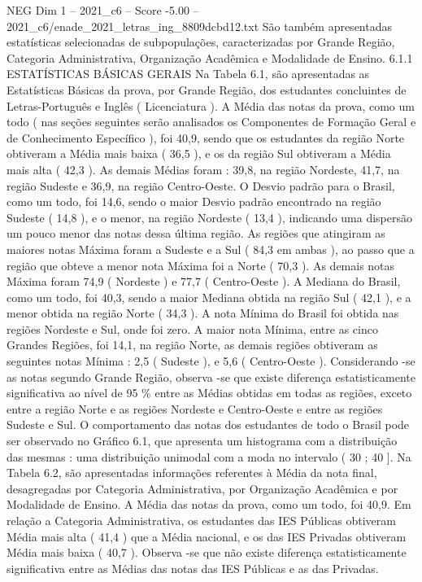 \begin{textsample}{NEG Dim 1 – 2021\_c6 – Score -5.00 – 2021\_c6/enade\_2021\_letras\_ing\_8809dcbd12.txt}
São também apresentadas estatísticas selecionadas de subpopulações, caracterizadas por Grande Região, Categoria Administrativa, Organização Acadêmica e Modalidade de Ensino. 6.1.1 ESTATÍSTICAS BÁSICAS GERAIS Na Tabela 6.1, são apresentadas as Estatísticas Básicas da prova, por Grande Região, dos estudantes concluintes de Letras-Português e Inglês ( Licenciatura ).
A Média das notas da prova, como um todo ( nas seções seguintes serão analisados os Componentes de Formação Geral e de Conhecimento Específico ), foi 40,9, sendo que os estudantes da região Norte obtiveram a Média mais baixa ( 36,5 ), e os da região Sul obtiveram a Média mais alta ( 42,3 ).
As demais Médias foram : 39,8, na região Nordeste, 41,7, na região Sudeste e 36,9, na região Centro-Oeste.
O Desvio padrão para o Brasil, como um todo, foi 14,6, sendo o maior Desvio padrão encontrado na região Sudeste ( 14,8 ), e o menor, na região Nordeste ( 13,4 ), indicando uma dispersão um pouco menor das notas dessa última região.
As regiões que atingiram as maiores notas Máxima foram a Sudeste e a Sul ( 84,3 em ambas ), ao passo que a região que obteve a menor nota Máxima foi a Norte ( 70,3 ).
As demais notas Máxima foram 74,9 ( Nordeste ) e 77,7 ( Centro-Oeste ).
A Mediana do Brasil, como um todo, foi 40,3, sendo a maior Mediana obtida na região Sul ( 42,1 ), e a menor obtida na região Norte ( 34,3 ).
A nota Mínima do Brasil foi obtida nas regiões Nordeste e Sul, onde foi zero.
A maior nota Mínima, entre as cinco Grandes Regiões, foi 14,1, na região Norte, as demais regiões obtiveram as seguintes notas Mínima : 2,5 ( Sudeste ), e 5,6 ( Centro-Oeste ).
Considerando -se as notas segundo Grande Região, observa -se que existe diferença estatisticamente significativa ao nível de 95 \% entre as Médias obtidas em todas as regiões, exceto entre a região Norte e as regiões Nordeste e Centro-Oeste e entre as regiões Sudeste e Sul.
O comportamento das notas dos estudantes de todo o Brasil pode ser observado no Gráfico 6.1, que apresenta um histograma com a distribuição das mesmas : uma distribuição unimodal com a moda no intervalo ( 30 ; 40 ].
Na Tabela 6.2, são apresentadas informações referentes à Média da nota final, desagregadas por Categoria Administrativa, por Organização Acadêmica e por Modalidade de Ensino.
A Média das notas da prova, como um todo, foi 40,9.
Em relação a Categoria Administrativa, os estudantes das IES Públicas obtiveram Média mais alta ( 41,4 ) que a Média nacional, e os das IES Privadas obtiveram Média mais baixa ( 40,7 ).
Observa -se que não existe diferença estatisticamente significativa entre as Médias das notas das IES Públicas e as das Privadas.

\end{textsample}
